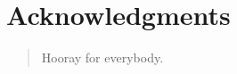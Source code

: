 \ifx\master\undefined\fi

\prelimheaders

\chapter*{Acknowledgments}

\begin{quote}
\centering
Hooray for everybody.
\end{quote}


\ifx\master\undefined\fi
